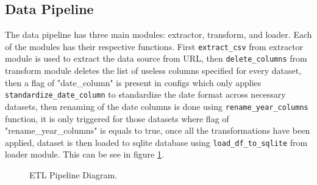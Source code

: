 \documentclass[a4paper,11pt]{article}
\begin{document}
\subsection{Data Pipeline}
The data pipeline has three main modules: extractor, transform, and loader. Each of the modules has their respective functions.
First \texttt{extract\_csv} from extractor module is used to extract the data source from URL, then \texttt{delete\_columns} from transform module deletes the list of useless columns specified for every dataset, then a flag of "date\_column" is present in configs which only applies \texttt{standardize\_date\_column} to standardize the date format across necessary datasets, then renaming of the date columns is done using \texttt{rename\_year\_columns} function, it is only triggered for those datasets where flag  of "rename\_year\_columns" is equals to true, once all the transformations have been applied, dataset is then loaded to sqlite database using \texttt{load\_df\_to\_sqlite} from loader module. This can be see in figure \ref{fig:etl_pipeline}.


\begin{figure}[ht!]
    \centering
    \caption{ETL Pipeline Diagram.}
    \label{fig:etl_pipeline}
\end{figure}
\end{document}

